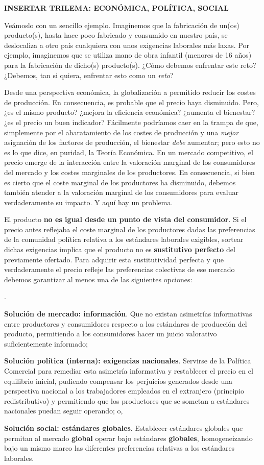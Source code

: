 \documentclass[10pt,a4paper]{article}
\newcounter{numitem}
\newenvironment{lnum}
      {\begin{list}{\arabic{numitem}.}{%
          \usecounter{numitem}%
          \setlength{\leftmargin}{1cm}%
          \setlength{\parskip}{3pt}%
          \setlength{\itemsep}{0pt}%
          \setlength{\parsep}{0pt}%
      }}
      {\end{list}}
\begin{document}
\textbf{INSERTAR TRILEMA: ECONÓMICA, POLÍTICA, SOCIAL}

Veámoslo con un sencillo ejemplo. Imaginemos que la fabricación de un(os) producto(s), hasta hace poco fabricado y consumido en nuestro país, se deslocaliza a otro país cualquiera con unos exigencias laborales más laxas. Por ejemplo, imaginemos que se utiliza mano de obra infantil (menores de 16 años) para la fabricación de dicho(s) producto(s). ¿Cómo debemos enfrentar este reto? ¿Debemos, tan si quiera, enfrentar esto como un \textit{reto}?

Desde una perspectiva económica, la globalización a permitido reducir los costes de producción. En consecuencia, es probable que el precio haya disminuido. Pero, ¿es el mismo producto? ¿mejora la eficiencia económica? ¿aumenta el bienestar? ¿es el precio un buen indicador? Fácilmente podríamos caer en la trampa de que, simplemente por el abaratamiento de los costes de producción y una \textit{mejor} asignación de los factores de producción, el bienestar \textit{debe} aumentar; pero esto no es lo que dice, en puridad, la Teoría Económica. En un mercado competitivo, el precio emerge de la interacción entre la valoración marginal de los consumidores del mercado y los costes marginales de los productores. En consecuencia, si bien es cierto que el coste marginal de los productores ha disminuido, debemos también atender a la valoración marginal de los consumidores para evaluar verdaderamente su impacto. Y aquí hay un problema. 

El producto \textbf{no es igual desde un punto de vista del consumidor}. Si el precio antes reflejaba el coste marginal de los productores dadas las preferencias de la comunidad política relativa a los estándares laborales exigibles, sortear dichas exigencias implica que el producto no es \textbf{sustitutivo perfecto} del previamente ofertado. Para adquirir esta sustitutividad perfecta y que verdaderamente el precio refleje las preferencias colectivas de ese mercado debemos garantizar al menos una de las siguientes opciones:
\begin{lnum}
    \item \textbf{Solución de mercado: información}. Que no existan asimetrías informativas entre productores y consumidores respecto a los estándares de producción del producto, permitiendo a los consumidores hacer un juicio valorativo suficientemente informado;
    \item \textbf{Solución política (interna): exigencias nacionales}. Servirse de la Política Comercial para remediar esta asimetría informativa y restablecer el precio en el equilibrio inicial, pudiendo compensar los perjuicios generados desde una perspectiva nacional a los trabajadores empleados en el extranjero (principio redistributivo) y permitiendo que los productores que se sometan a estándares nacionales puedan seguir operando; o,
    \item \textbf{Solución social: estándares globales}. Establecer estándares globales que permitan al mercado \textbf{global} operar bajo estándares \textbf{globales}, homogeneizando bajo un mismo marco las diferentes preferencias relativas a los estándares laborales. 
\end{lnum}
\end{document}
